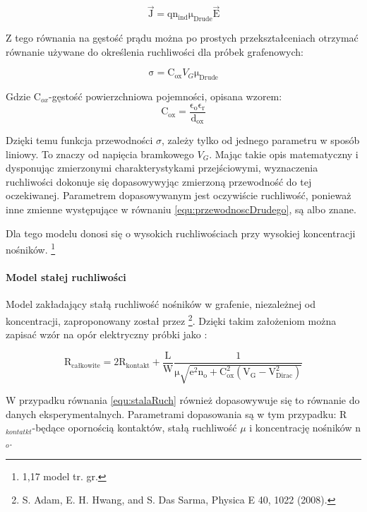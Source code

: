 \begin{equation}
    \mathrm{ \vec J =q n_{ind} \mu_{Drude} \vec E }
\end{equation}

Z tego równania na gęstość prądu można po prostych przekształceniach otrzymać równanie używane do określenia ruchliwości 
dla próbek grafenowych:

\begin{equation}
   \mathrm{ \sigma = C_{ox}} V_G\mathrm{ \mu_{Drude}}
	\label{equ:przewodnoscDrudego}
\end{equation}

Gdzie C$_{ox}$-gęstość powierzchniowa pojemności, opisana wzorem:
\begin{equation}
   \mathrm{C_{ox}= \frac {\epsilon_o \epsilon_r}{d_{ox}}}
\end{equation}

Dzięki temu funkcja przewodności $\sigma$, zależy tylko od jednego parametru w sposób liniowy. To znaczy od napięcia
bramkowego $V_G$. Mając takie opis matematyczny i dysponując zmierzonymi charakterystykami przejściowymi, wyznaczenia
ruchliwości dokonuje się dopasowywyjąc zmierzoną przewodność do tej oczekiwanej. Parametrem dopasowywanym jest oczywiście
ruchliwość, ponieważ inne zmienne występujące w równaniu \ref{equ:przewodnoscDrudego}, są albo znane.

Dla tego modelu donosi się o wysokich ruchliwościach przy wysokiej koncentracji nośników. \footnote{1,17 model tr. gr.}

\paragraph{Model stałej ruchliwości}
Model zakładający stałą ruchliwość nośników w grafenie, niezależnej od koncentracji, zaproponowany został przez 
\footnote{S. Adam, E. H. Hwang, and S. Das Sarma, Physica E 40, 1022 (2008).}. 
Dzięki takim założeniom można zapisać wzór na opór elektryczny próbki jako :

\begin{equation}
    \mathrm{ R_{całkowite} = 2R_{kontakt}+ \frac{L}{W}\frac{1}{\mu \sqrt{e^2 n_o + C_{ox}^2(V_G-V_{Dirac}^2)}}}
	\label{equ:stalaRuch}
\end{equation}

W przypadku równania \ref{equ:stalaRuch} również dopasowywuje się to równanie do danych eksperymentalnych. Parametrami
dopasowania są w tym przypadku: R$_{kontatkt}$-będące opornością kontaktów, stałą ruchliwość $\mu$  i koncentrację nośników
n$_o$.

